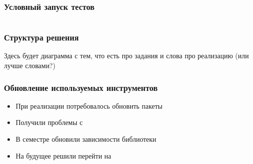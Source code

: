 \documentclass[aspectratio=169]{beamer}
\begin{document}
\begin{frame}[fragile=singleslide]
	\frametitle{Условный запуск тестов}

	\begin{center}
		\inputminted[]{python3}{pictures/minimal_example.py}
	\end{center}

\end{frame}

\begin{frame}
	\frametitle{Структура решения}

	Здесь будет диаграмма с тем, что есть про задания и слова про реализацию (или лучше словами?)

\end{frame}

\begin{frame}
	\frametitle{Обновление используемых инструментов}

	\begin{itemize}
		\item При реализации потребовалось обновить пакеты
		\item Получили проблемы с \pip{}
		\item В семестре обновили зависимости библиотеки \cfpqdata
		\item На будущее решили перейти на \poetry
	\end{itemize}

\end{frame}
\end{document}
